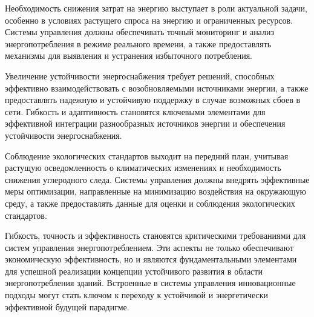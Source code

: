 Необходимость снижения затрат на энергию выступает в роли актуальной задачи, особенно в условиях растущего спроса на энергию и ограниченных ресурсов. Системы управления должны обеспечивать точный мониторинг и анализ энергопотребления в режиме реального времени, а также предоставлять механизмы для выявления и устранения избыточного потребления.

Увеличение устойчивости энергоснабжения требует решений, способных эффективно взаимодействовать с возобновляемыми источниками энергии, а также предоставлять надежную и устойчивую поддержку в случае возможных сбоев в сети. Гибкость и адаптивность становятся ключевыми элементами для эффективной интеграции разнообразных источников энергии и обеспечения устойчивости энергоснабжения.

Соблюдение экологических стандартов выходит на передний план, учитывая растущую осведомленность о климатических изменениях и необходимость снижения углеродного следа. Системы управления должны внедрять эффективные меры оптимизации, направленные на минимизацию воздействия на окружающую среду, а также предоставлять данные для оценки и соблюдения экологических стандартов.

Гибкость, точность и эффективность становятся критическими требованиями для систем управления энергопотреблением. Эти аспекты не только обеспечивают экономическую эффективность, но и являются фундаментальными элементами для успешной реализации концепции устойчивого развития в области энергопотребления зданий. Встроенные в системы управления инновационные подходы могут стать ключом к переходу к устойчивой и энергетически эффективной будущей парадигме.